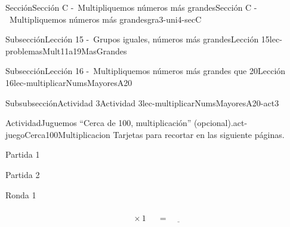 \begin{sectionptx}{Sección}{Sección C -~Multipliquemos números más grandes}{}{Sección C -~Multipliquemos números más grandes}{}{}{gra3-uni4-secC}
\begin{subsectionptx}{Subsección}{Lección 15 -~Grupos iguales, números más grandes}{}{Lección 15}{}{}{lec-problemasMult11a19MasGrandes}
\end{subsectionptx}
%
%
\typeout{************************************************}
\typeout{************************************************}
%
\begin{subsectionptx}{Subsección}{Lección 16 -~Multipliquemos números más grandes que 20}{}{Lección 16}{}{}{lec-multiplicarNumsMayoresA20}
%
%
\typeout{************************************************}
\typeout{************************************************}
%
\clearpage
\begin{subsubsectionptx}{Subsubsección}{Actividad 3}{}{Actividad 3}{}{}{lec-multiplicarNumsMayoresA20-act3}
\begin{activity}{Actividad}{Juguemos “Cerca de 100, multiplicación” (opcional).}{act-juegoCerca100Multiplicacion}%
Tarjetas para recortar en las siguiente páginas.%
\begin{sidebyside}{2}{0}{0}{0.1}%
\begin{sbspanel}{0.45}%
\alert{Partida 1}%
\end{sbspanel}%
\begin{sbspanel}{0.45}%
\par
\alert{Partida 2}%
\end{sbspanel}%
\end{sidebyside}%
\begin{sidebyside}{2}{0}{0}{0.1}%
\begin{sbspanel}{0.45}%
Ronda 1%
\par
%
\begin{equation*}
\boxed{\phantom{\frac{00}{00}}} \times 1 \ \boxed{\phantom{\frac{00}{00}}}= \underline{\hspace{1cm}}
\end{equation*}
%
\end{sbspanel}%

\end{sidebyside}
\end{activity}
\end{subsubsectionptx}
\end{subsectionptx}
\end{sectionptx}
